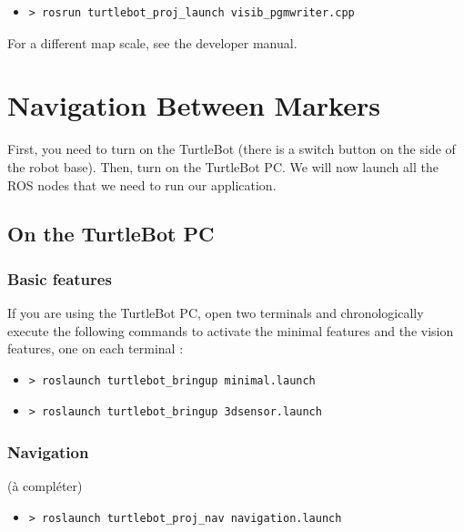 \documentclass[10pt,a4paper]{article}
\begin{document}
\begin{itemize}
\item[]  \begin{verbatim}> rosrun turtlebot_proj_launch visib_pgmwriter.cpp \end{verbatim}
\end{itemize}

For a different map scale, see the developer manual.

\newpage
\section{Navigation Between Markers}
\label{sec:Navigation Between Markers}

First, you need to turn on the TurtleBot (there is a switch button on the side of the robot base). Then, turn on the TurtleBot PC. We will now launch all the ROS nodes that we need to run our application.

\subsection{On the TurtleBot PC}

\subsubsection{Basic features}

If you are using the TurtleBot PC, open two terminals and chronologically execute the following commands to activate the minimal features and the vision features, one on each terminal :

\begin{itemize}
\item[]  \begin{verbatim}> roslaunch turtlebot_bringup minimal.launch \end{verbatim}
\item[]  \begin{verbatim}> roslaunch turtlebot_bringup 3dsensor.launch \end{verbatim}
\end{itemize}

\subsubsection{Navigation}

(à compléter)

\begin{itemize}
\item[]  \begin{verbatim}> roslaunch turtlebot_proj_nav navigation.launch \end{verbatim}
\end{itemize}
\end{document}
